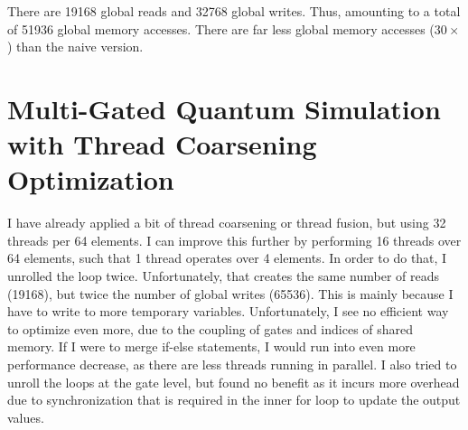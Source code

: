 \documentclass{article}
\begin{document}
There are 19168 global reads and 32768 global writes. Thus, amounting to a total of 51936 global memory accesses. There are far less global memory accesses ($30\times$) than the naive version.


\section{Multi-Gated Quantum Simulation with Thread Coarsening Optimization}
I have already applied a bit of thread coarsening or thread fusion, but using 32 threads per 64 elements. I can improve this further by performing 16 threads over 64 elements, such that 1 thread operates over 4 elements. In order to do that, I unrolled the loop twice. Unfortunately, that creates the same number of reads (19168), but twice the number of global writes (65536). This is mainly because I have to write to more temporary variables. Unfortunately, I see no efficient way to optimize even more, due to the coupling of gates and indices of shared memory. If I were to merge if-else statements, I would run into even more performance decrease, as there are less threads running in parallel. I also tried to unroll the loops at the gate level, but found no benefit as it incurs more overhead due to synchronization that is required in the inner for loop to update the output values. 
\end{document}
